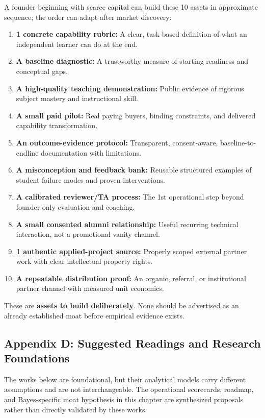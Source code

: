 A founder beginning with scarce capital can build these 10 assets in approximate sequence; the order can adapt after market discovery:
\begin{enumerate}
    \item \textbf{1 concrete capability rubric:} A clear, task-based definition of what an independent learner can do at the end.
    \item \textbf{A baseline diagnostic:} A trustworthy measure of starting readiness and conceptual gaps.
    \item \textbf{A high-quality teaching demonstration:} Public evidence of rigorous subject mastery and instructional skill.
    \item \textbf{A small paid pilot:} Real paying buyers, binding constraints, and delivered capability transformation.
    \item \textbf{An outcome-evidence protocol:} Transparent, consent-aware, baseline-to-endline documentation with limitations.
    \item \textbf{A misconception and feedback bank:} Reusable structured examples of student failure modes and proven interventions.
    \item \textbf{A calibrated reviewer/TA process:} The 1st operational step beyond founder-only evaluation and coaching.
    \item \textbf{A small consented alumni relationship:} Useful recurring technical interaction, not a promotional vanity channel.
    \item \textbf{1 authentic applied-project source:} Properly scoped external partner work with clear intellectual property rights.
    \item \textbf{A repeatable distribution proof:} An organic, referral, or institutional partner channel with measured unit economics.
\end{enumerate}

These are \textbf{assets to build deliberately}. None should be advertised as an already established moat before empirical evidence exists.

\subsection*{Appendix D: Suggested Readings and Research Foundations}
\label{sec:appendix_d_readings_foundations}

The works below are foundational, but their analytical models carry different assumptions and are not interchangeable. The operational scorecards, roadmap, and Bayes-specific moat hypothesis in this chapter are synthesized proposals rather than directly validated by these works.

